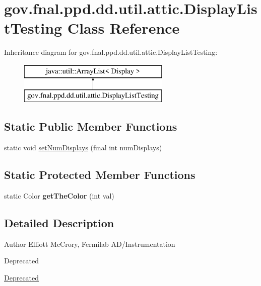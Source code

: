 \hypertarget{classgov_1_1fnal_1_1ppd_1_1dd_1_1util_1_1attic_1_1DisplayListTesting}{\section{gov.\-fnal.\-ppd.\-dd.\-util.\-attic.\-Display\-List\-Testing Class Reference}
\label{classgov_1_1fnal_1_1ppd_1_1dd_1_1util_1_1attic_1_1DisplayListTesting}
}
Inheritance diagram for gov.\-fnal.\-ppd.\-dd.\-util.\-attic.\-Display\-List\-Testing\-:\begin{figure}[H]
\begin{center}
\leavevmode
\includegraphics[height=2.000000cm]{classgov_1_1fnal_1_1ppd_1_1dd_1_1util_1_1attic_1_1DisplayListTesting}
\end{center}
\end{figure}
\subsection*{Static Public Member Functions}
\begin{DoxyCompactItemize}
\item 
static void \hyperlink{classgov_1_1fnal_1_1ppd_1_1dd_1_1util_1_1attic_1_1DisplayListTesting_a27ae605c02ef4173f6166d460f71d048}{set\-Num\-Displays} (final int num\-Displays)
\end{DoxyCompactItemize}
\subsection*{Static Protected Member Functions}
\begin{DoxyCompactItemize}
\item 
\hypertarget{classgov_1_1fnal_1_1ppd_1_1dd_1_1util_1_1attic_1_1DisplayListTesting_a92bdc1a1bdd9bb68fc3189bc43dbf5fa}{static Color {\bfseries get\-The\-Color} (int val)}\label{classgov_1_1fnal_1_1ppd_1_1dd_1_1util_1_1attic_1_1DisplayListTesting_a92bdc1a1bdd9bb68fc3189bc43dbf5fa}

\end{DoxyCompactItemize}


\subsection{Detailed Description}
\begin{DoxyAuthor}{Author}
Elliott Mc\-Crory, Fermilab A\-D/\-Instrumentation 
\end{DoxyAuthor}
\begin{DoxyRefDesc}{Deprecated}
\item[\hyperlink{deprecated__deprecated000010}{Deprecated}]\end{DoxyRefDesc}


